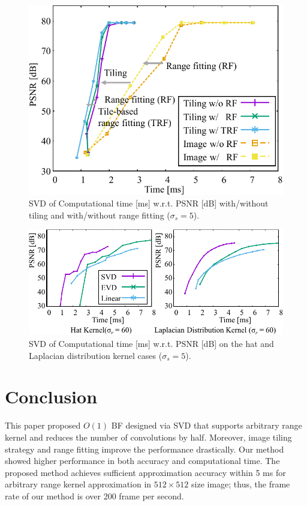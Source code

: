 \documentclass{article}
\begin{document}
\begin{figure}[t]
\centering
\includegraphics[width=0.8\columnwidth]{fig/schedule.pdf}
\vspace{-4mm}
\caption{SVD of Computational time [ms] w.r.t. PSNR [dB] with/without tiling and with/without range fitting ($\sigma_s = 5$).}
\label{f:scheduling}
\vspace{-3mm}
\end{figure}
\begin{figure}[t]
\centering
\includegraphics[width=\columnwidth]{fig/hat_lap.pdf}
\vspace{-3mm}
\caption{SVD of Computational time [ms] w.r.t. PSNR [dB] on the hat and Laplacian distribution kernel cases ($\sigma_s = 5$).}
\label{f:hatlap}
\vspace{-2mm}
\end{figure}

\section{Conclusion}

This paper proposed $O(1)$ BF designed via SVD that supports arbitrary range kernel and reduces the number of convolutions by half.
Moreover, image tiling strategy and range fitting improve the performance drastically.
Our method showed higher performance in both accuracy and computational time.
The proposed method achieves sufficient approximation accuracy within 5 ms for arbitrary range kernel approximation in $512\times 512$ size image; thus, the frame rate of our method is over 200 frame per second.
\clearpage

\small

\end{document}

